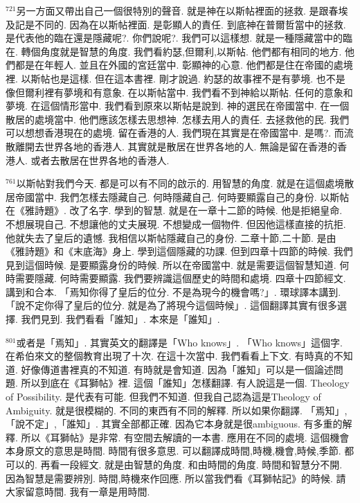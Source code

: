 \documentclass{book}
\begin{document}
$^{721}$另一方面又帶出自己一個很特別的聲音.
就是神在以斯帖裡面的拯救.
是跟春埃及記是不同的.
因為在以斯帖裡面.
是彰顯人的責任.
到底神在普爾哲當中的拯救.
是代表他的臨在還是隱藏呢?.
你們說呢?.
我們可以這樣想.
就是一種隱藏當中的臨在.
轉個角度就是智慧的角度.
我們看約瑟,但爾利,以斯帖.
他們都有相同的地方.
他們都是在年輕人.
並且在外國的宮廷當中.
彰顯神的心意.
他們都是住在帝國的處境裡.
以斯帖也是這樣.
但在這本書裡.
剛才說過.
約瑟的故事裡不是有夢境.
也不是像但爾利裡有夢境和有意象.
在以斯帖當中.
我們看不到神給以斯帖.
任何的意象和夢境.
在這個情形當中.
我們看到原來以斯帖是說到.
神的選民在帝國當中.
在一個散居的處境當中.
他們應該怎樣去思想神.
怎樣去用人的責任.
去拯救他的民.
我們可以想想香港現在的處境.
留在香港的人.
我們現在其實是在帝國當中.
是嗎?.
而流散離開去世界各地的香港人.
其實就是散居在世界各地的人.
無論是留在香港的香港人.
或者去散居在世界各地的香港人.

$^{761}$以斯帖對我們今天.
都是可以有不同的啟示的.
用智慧的角度.
就是在這個處境散居帝國當中.
我們怎樣去隱藏自己.
何時隱藏自己.
何時要顯露自己的身份.
以斯帖在《雅詩題》.
改了名字.
學到的智慧.
就是在一章十二節的時候.
他是拒絕皇命.
不想展現自己.
不想讓他的丈夫展現.
不想變成一個物件.
但因他這樣直接的抗拒.
他就失去了皇后的遺憾.
我相信以斯帖隱藏自己的身份.
二章十節,二十節.
是由《雅詩題》和《末底海》身上.
學到這個隱藏的功課.
但到四章十四節的時候.
我們見到這個時候.
是要顯露身份的時候.
所以在帝國當中.
就是需要這個智慧知道.
何時需要隱藏.
何時需要顯露.
我們要辨識這個歷史的時間和處境.
四章十四節經文.
講到和合本.
「焉知你得了皇后的位分.
不是為現今的機會嗎?」.
環球譯本講到.
「說不定你得了皇后的位分.
就是為了將現今這個時候」.
這個翻譯其實有很多選擇.
我們見到.
我們看看「誰知」.
本來是「誰知」.

$^{801}$或者是「焉知」.
其實英文的翻譯是「Who knows」.
「Who knows」這個字.
在希伯來文的整個教育出現了十次.
在這十次當中.
我們看看上下文.
有時真的不知道.
好像傳道書裡真的不知道.
有時就是會知道.
因為「誰知」可以是一個論述問題.
所以到底在《耳獅帖》裡.
這個「誰知」怎樣翻譯.
有人說這是一個.
Theology of Possibility.
是代表有可能.
但我們不知道.
但我自己認為這是Theology of Ambiguity.
就是很模糊的.
不同的東西有不同的解釋.
所以如果你翻譯.
「焉知」,「說不定」,「誰知」.
其實全部都正確.
因為它本身就是很ambiguous.
有多重的解釋.
所以《耳獅帖》是非常.
有空間去解讀的一本書.
應用在不同的處境.
這個機會本身原文的意思是時間.
時間有很多意思.
可以翻譯成時間,時機,機會,時候,季節.
都可以的.
再看一段經文.
就是由智慧的角度.
和由時間的角度.
時間和智慧分不開.
因為智慧是需要辨別.
時間,時機來作回應.
所以當我們看《耳獅帖記》的時候.
請大家留意時間.
我有一章是用時間.
\end{document}
